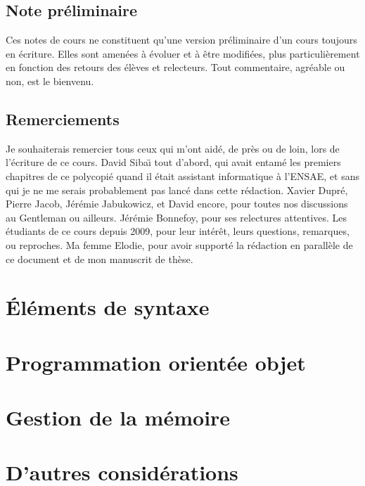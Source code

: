 \documentclass[a4paper]{book}
\begin{document}


\chapter{Note pr\'eliminaire}
Ces notes de cours ne constituent qu'une version pr\'eliminaire d'un cours toujours en \'ecriture. Elles sont amen\'ees \`a \'evoluer et \`a \^etre modifi\'ees,
plus particuli\`erement en fonction des retours des \'el\`eves et relecteurs. Tout commentaire, agr\'eable ou non, est le bienvenu.


\chapter*{Remerciements}
Je souhaiterais remercier tous ceux qui m'ont aid\'e, de pr\`es ou de loin, lors de l'\'ecriture de ce cours. David Siba\"{\i} tout d'abord, qui avait entam\'e les premiers chapitres de ce polycopi\'e quand il \'etait assistant informatique \`{a} l'ENSAE, et sans qui je ne me serais probablement pas lanc\'e dans cette r\'edaction. Xavier Dupr\'e, Pierre Jacob, J\'er\'emie Jabukowicz, et David encore, pour toutes nos discussions au Gentleman ou ailleurs. J\'er\'emie Bonnefoy, pour ses relectures attentives. Les \'etudiants de ce cours depuis 2009, pour leur int\'er\^{e}t, leurs questions, remarques, ou reproches. Ma femme Elodie, pour avoir support\'e la r\'edaction en parall\`{e}le de ce document et de mon manuscrit de th\`{e}se.

\begin{quote}

\end{quote}

\tableofcontents



\part{\'El\'ements de syntaxe}





%
\part{Programmation orient\'ee objet}





\part{Gestion de la m\'emoire}


\part{D'autres consid\'erations}



\lstlistoflistings

\nocite{*}


\end{document}
